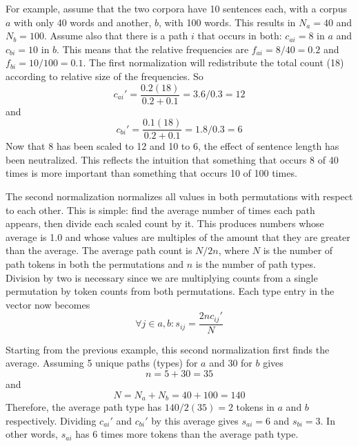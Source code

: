 \documentclass[11pt]{article}
\begin{document}
For example, assume that the two corpora have 10 sentences each, with
a corpus $a$ with only 40 words and another, $b$, with 100 words. This
results in $N_a = 40$ and $N_b = 100$. Assume also that there is a
path $i$ that occurs in both: $c_{ai} = 8$ in  $a$ and $c_{bi} = 10$ in
$b$. This means that the relative frequencies are $f_{ai} = 8/40 = 0.2$
and $f_{bi} = 10/100 = 0.1$. The first normalization will redistribute the
total count (18) according to relative size of the frequencies. So
\[c_{ai}' = \frac{0.2(18)}{0.2+0.1} = 3.6 / 0.3 = 12\] and
\[c_{bi}' = \frac{0.1(18)}{0.2+0.1} = 1.8 / 0.3 = 6\]
Now that 8 has been scaled to 12 and 10 to 6, the effect of sentence length
has been neutralized. This reflects the intuition that something that
occurs 8 of 40 times is more important than something that occurs 10
of 100 times.

The second normalization normalizes all values in both
permutations with respect to each other. This is simple: find the
average number of times each path appears, then divide each scaled
count by it. This produces numbers whose average is 1.0 and whose
values are multiples of the amount that they are greater than the average.
The average path
count is $N / 2n$, where $N$ is the number of path tokens in
both the permutations and $n$ is the number of path types. Division by
two is necessary since we are multiplying counts from a single permutation by
token counts from both permutations. Each type entry in the
vector now becomes \[\forall j \in a,b : s_{ij} = \frac{2nc_{ij}'}{N}\]

Starting from the previous example, this second normalization first
finds the average. Assuming 5 unique paths (types) for $a$ and 30 for
$b$ gives \[n = 5 + 30 = 35\] and
\[N = N_a + N_b = 40 + 100 = 140\]
Therefore, the average path type has $140 / 2(35) = 2$
tokens in $a$ and $b$ respectively. Dividing $c_{ai}'$ and $c_{bi}'$ by this average gives $s_{ai} = 6$
and $s_{bi} = 3$. In other words, $s_{ai}$ has 6 times more tokens
than the average path type.

\end{document}
